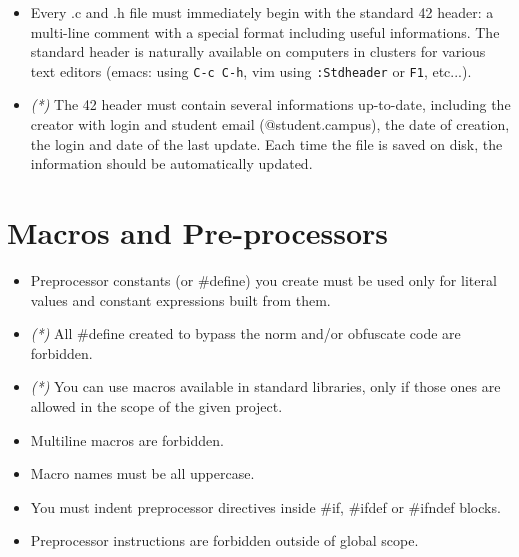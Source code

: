 \documentclass{42-en}
\begin{document}
        \begin{itemize}

        \item Every .c and .h file must immediately begin with the standard 42 header:
          a multi-line comment with a special format including useful informations. The
          standard header is naturally available on computers in clusters for various
          text editors (emacs: using \texttt{C-c C-h}, vim using \texttt{:Stdheader} or
          \texttt{F1}, etc...).

        \item \textit{(*)} The 42 header must contain several informations up-to-date, including the
          creator with login and student email (@student.campus), the date of creation,
          the login and date of the last update. Each time the file is saved on disk,
          the information should be automatically updated.

        \end{itemize}
        
        \newpage


    \section{Macros and Pre-processors}

        \begin{itemize}

            \item Preprocessor constants (or \#define) you create must be used
                only for literal values and constant expressions built from them.
            \item \textit{(*)} All \#define created to bypass the norm and/or obfuscate
                code are forbidden.
            \item \textit{(*)} You can use macros available in standard libraries, only
                if those ones are allowed in the scope of the given project.
            \item Multiline macros are forbidden.
            \item Macro names must be all uppercase.
            \item You must indent preprocessor directives inside \#if, \#ifdef
                or \#ifndef blocks.
            \item Preprocessor instructions are forbidden outside of global scope.

        \end{itemize}
        \newpage
\end{document}
